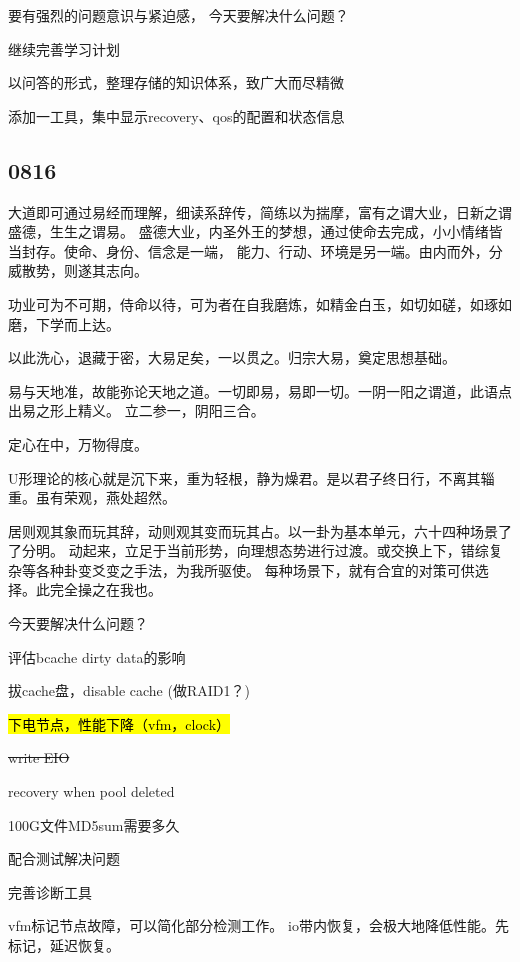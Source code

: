 要有强烈的问题意识与紧迫感，
今天要解决什么问题？
\begin{enumbox}
\item 继续完善学习计划
\item 以问答的形式，整理存储的知识体系，致广大而尽精微
\item 添加一工具，集中显示recovery、qos的配置和状态信息
\end{enumbox}

\subsection{0816}

大道即可通过易经而理解，细读系辞传，简练以为揣摩，富有之谓大业，日新之谓盛德，生生之谓易。
盛德大业，内圣外王的梦想，通过使命去完成，小小情绪皆当封存。使命、身份、信念是一端，
能力、行动、环境是另一端。由内而外，分威散势，则遂其志向。

功业可为不可期，侍命以待，可为者在自我磨炼，如精金白玉，如切如磋，如琢如磨，下学而上达。

以此洗心，退藏于密，大易足矣，一以贯之。归宗大易，奠定思想基础。

易与天地准，故能弥论天地之道。一切即易，易即一切。一阴一阳之谓道，此语点出易之形上精义。
立二参一，阴阳三合。

定心在中，万物得度。

U形理论的核心就是沉下来，重为轻根，静为燥君。是以君子终日行，不离其辎重。虽有荣观，燕处超然。

居则观其象而玩其辞，动则观其变而玩其占。以一卦为基本单元，六十四种场景了了分明。
动起来，立足于当前形势，向理想态势进行过渡。或交换上下，错综复杂等各种卦变爻变之手法，为我所驱使。
每种场景下，就有合宜的对策可供选择。此完全操之在我也。

今天要解决什么问题？
\begin{enumbox}
\item 评估bcache dirty data的影响
\item 拔cache盘，disable cache (做RAID1？)
\item \hl{下电节点，性能下降（vfm，clock）}
\item \sout{write EIO}
\item recovery when pool deleted
\item 100G文件MD5sum需要多久
\item 配合测试解决问题
\item 完善诊断工具
\end{enumbox}

vfm标记节点故障，可以简化部分检测工作。
io带内恢复，会极大地降低性能。先标记，延迟恢复。

